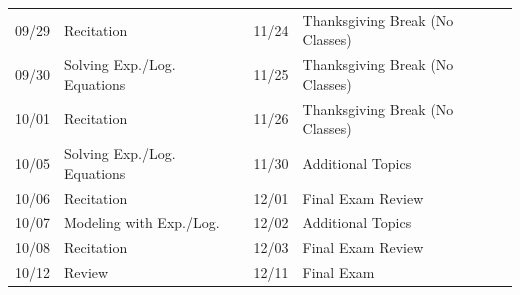 \documentclass[11pt,letterpaper]{article}
\begin{document}
\begin{table}[!ht]
{\begin{tabular}{ll || ll}
	09/29 & Recitation & 11/24 & Thanksgiving Break (No Classes) \\
	09/30 & Solving Exp./Log. Equations & 11/25 & Thanksgiving Break (No Classes) \\
	10/01 & Recitation & 11/26 & Thanksgiving Break (No Classes) \\
	10/05 & Solving Exp./Log. Equations & 11/30 & Additional Topics \\
	10/06 & Recitation & 12/01 & Final Exam Review \\
	10/07 & Modeling with Exp./Log. & 12/02 & Additional Topics \\
	10/08 & Recitation & 12/03 & Final Exam Review \\
	10/12 & Review & 12/11 & Final Exam
        \end{tabular}
        }
        \end{table}
\end{document}

